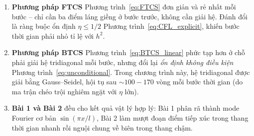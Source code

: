 \documentclass[12pt,a4paper]{article}
\begin{document}
\begin{enumerate}
    \item \textbf{Phương pháp FTCS} Phương trình~\eqref{eq:FTCS} đơn giản và rẻ nhất mỗi bước -- chỉ cần ba điểm láng giềng ở bước trước, không cần giải hệ. Đánh đổi là ràng buộc ổn định $\eta \le 1/2$ Phương trình~\eqref{eq:CFL_explicit}, khiến bước thời gian phải nhỏ tỉ lệ với $h^2$.

    \item \textbf{Phương pháp BTCS} Phương trình~\eqref{eq:BTCS_linear} phức tạp hơn ở chỗ phải giải hệ tridiagonal mỗi bước, nhưng đổi lại \emph{ổn định không điều kiện} Phương trình~\eqref{eq:unconditional}. Trong chương trình này, hệ tridiagonal được giải bằng Gauss--Seidel, hội tụ sau $\sim 100\!-\!170$ vòng mỗi bước thời gian (do ma trận chéo trội nghiêm ngặt với $\eta$ lớn).

    \item \textbf{Bài 1 và Bài 2} đều cho kết quả vật lý hợp lý: Bài 1 phân rã thành mode Fourier cơ bản $\sin(\pi x/l)$, Bài 2 làm mượt đoạn điểm tiếp xúc trong thang thời gian nhanh rồi nguội chung về biên trong thang chậm.

\end{enumerate}
\end{document}
